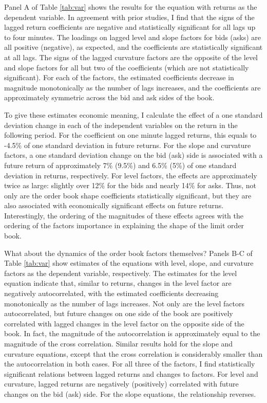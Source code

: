 	Panel A of Table \ref{tab:var} shows the results for the equation with returns as the dependent variable. In agreement with prior studies, I find that the signs of the lagged return coefficients are negative and statistically significant for all lags up to four minutes. The loadings on lagged level and slope factors for bids (asks) are all positive (negative), as expected, and the coefficients are statistically significant at all lags. The signs of the lagged curvature factors are the opposite of the level and slope factors for all but two of the coefficients (which are not statistically significant). For each of the factors, the estimated coefficients decrease in magnitude monotonically as the number of lags increases, and the coefficients are approximately symmetric across the bid and ask sides of the book.




	To give these estimates economic meaning, I calculate the effect of a one standard deviation change in each of the independent variables on the return in the following period. For the coefficient on one minute lagged returns, this equals to -4.5\% of one standard deviation in future returns. For the slope and curvature factors, a one standard deviation change on the bid (ask) side is associated with a future return of approximately 7\% (9.5\%) and 6.5\% (5\%) of one standard deviation in returns, respectively. For level factors, the effects are approximately twice as large: slightly over 12\% for the bids and nearly 14\% for asks. Thus, not only are the order book shape coefficients statistically significant, but they are also associated with economically significant effects on future returns. Interestingly, the ordering of the magnitudes of these effects agrees with the ordering of the factors importance in explaining the shape of the limit order book.

	What about the dynamics of the order book factors themselves? Panels B-C of Table \ref{tab:var} show estimates of the equations with level, slope, and curvature factors as the dependent variable, respectively. The estimates for the level equation indicate that, similar to returns, changes in the level factor are negatively autocorrelated, with the estimated coefficients decreasing monotonically as the number of lags increases. Not only are the level factors autocorrelated, but future changes on one side of the book are positively correlated with lagged changes in the level factor on the opposite side of the book. In fact, the magnitude of the autocorrelation is approximately equal to the magnitude of the cross correlation. Similar results hold for the slope and curvature equations, except that the cross correlation is considerably smaller than the autocorrelation in both cases. For all three of the factors, I find statistically significant relations between lagged returns and changes to factors. For level and curvature, lagged returns are negatively (positively) correlated with future changes on the bid (ask) side. For the slope equations, the relationship reverses.


